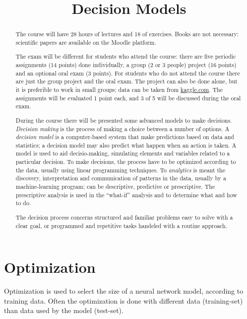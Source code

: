 \documentclass[11pt, twocolumn]{article}
\title{\textbf{Decision Models}}
\author{}
\date{}
\begin{document}
\maketitle
\begin{abstract}
  The course will have 28 hours of lectures and 18 of exercises.
  Books are not necessary: scientific papers are available on the Moodle platform.

  The exam will be different for students who attend the course: there are five periodic assignments (14 points) done individually, a group (2 or 3 people) project (16 points) and an optional oral exam (3 points).
  For students who do not attend the course there are just the group project and the oral exam.
  The project can also be done alone, but it is preferible to work in small groups; data can be taken from \url{kaggle.com}.
  The assignments will be evaluated 1 point each, and 3 of 5 will be discussed during the oral exam. \newline

  During the course there will be presented some advanced models to make decisions.
  \textit{Decision making} is the process of making a choice between a number of options.
  A \textit{decision model} is a computer-based system that make predictions based on data and statistics; a decision model may also predict what happen when an action is taken.
  A model is used to aid decisio-making, simulating elements and variables related to a particular decision.
  To make decisions, the process have to be optimized according to the data, usually using linear programming techniques.
  To \textit{analytics} is meant the discovery, interpretation and communication of patterns in the data, usually by a machine-learning program; can be descriptive, predictive or prescriptive.
  The prescriptive analysis is used in the ``what-if'' analysis and to determine what and how to do.

  The decision process concerns structured and familiar problems easy to solve with a clear goal, or programmed and repetitive tasks handeled with a routine approach.
\end{abstract}


\newpage
\part{Optimization}
Optimization is used to select the size of a neural network model, according to training data.
Often the optimization is done with different data (training-set) than data used by the model (test-set).
\end{document}
